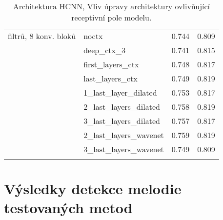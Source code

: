 \documentclass[12pt,a4paper]{report}
\begin{document}
\begin{table}[h]
\begin{tabular}{llrr}
\arrayrulecolor{black!30}\midrule
16 filtrů, 8 konv. bloků & noctx & 0.744 & 0.809 \\
{} & deep\_ctx\_3 & 0.741 & 0.815 \\
{} & first\_layers\_ctx & 0.748 & 0.817 \\
{} & last\_layers\_ctx & 0.749 & 0.819 \\
{} & 1\_last\_layer\_dilated & 0.753 & 0.817 \\
{} & 2\_last\_layers\_dilated & 0.758 & 0.819 \\
{} & 3\_last\_layers\_dilated & 0.757 & 0.817 \\
{} & 2\_last\_layers\_wavenet & 0.759 & 0.819 \\
{} & 3\_last\_layers\_wavenet & 0.749 & 0.809 \\
\arrayrulecolor{black}\bottomrule
    \end{tabular}
\caption{Architektura HCNN, Vliv úpravy architektury ovlivňující receptivní pole modelu.}\label{tab:spectrogram_ctx_archs}
\end{table}

\section{Výsledky detekce melodie testovaných metod}\label{appendix:voicing}
\end{document}
